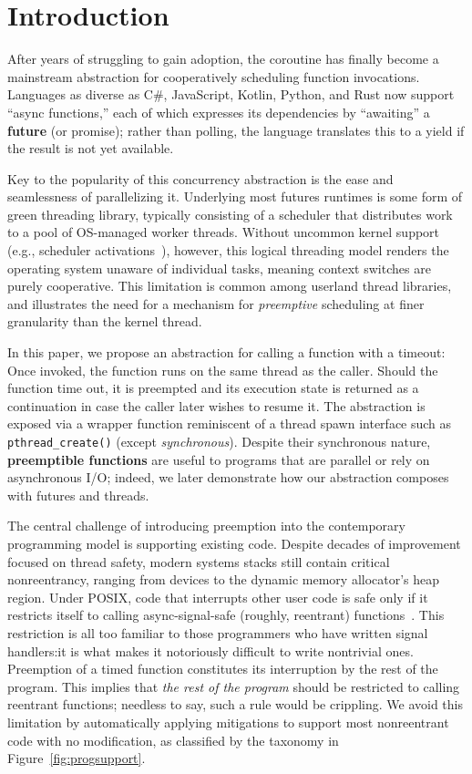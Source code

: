 \section{Introduction}
\label{sec:intro}

After years of struggling to gain adoption, the coroutine has finally become a
mainstream abstraction for cooperatively scheduling function invocations.  Languages
as diverse as C\#, JavaScript, Kotlin, Python, and Rust now support ``async
functions,'' each of which expresses its dependencies by ``awaiting'' a
\textbf{future} (or promise); rather than polling, the language translates this to a
yield if the result is not yet available.

Key to the popularity of this concurrency abstraction is the ease and seamlessness of
parallelizing it.  Underlying most futures runtimes is some form of green threading
library, typically consisting of a scheduler that distributes work to a pool of
OS-managed worker threads.  Without uncommon kernel
support (e.g., scheduler activations~\cite{anderson:sosp1991}), however, this logical
threading model renders the operating system unaware of individual tasks, meaning
context switches are purely cooperative.  This limitation is common among userland
thread libraries, and illustrates the need for a mechanism for \textit{preemptive}
scheduling at finer granularity than the kernel thread.

In this paper, we propose an abstraction for calling a function with a timeout:  Once
invoked, the function runs on the same thread as the caller.  Should the function
time out, it is preempted and its execution state is returned as a continuation in
case the caller later wishes to resume it.  The abstraction is exposed via a wrapper
function reminiscent of a thread spawn interface such as \texttt{pthread\_create()}
(except \textit{synchronous}).  Despite their synchronous nature, \textbf{preemptible
functions} are useful to programs that are parallel or rely on asynchronous I/O;
indeed, we later demonstrate how our abstraction composes with futures and threads.

The central challenge of introducing preemption into the contemporary programming
model is supporting existing code.  Despite decades of improvement focused on thread
safety, modern systems stacks still contain critical nonreentrancy, ranging from
devices to the dynamic memory allocator's heap region.
Under POSIX, code that interrupts other user code is safe only if it restricts
itself to calling async-signal-safe (roughly, reentrant)
functions~\cite{signal-safety-manpage}.  This restriction is all too familiar to
those programmers who have written signal handlers:\@ it is what makes it notoriously
difficult to write nontrivial ones.  Preemption of a timed function constitutes its
interruption by the rest of the program.  This implies that \textit{the rest of the
program} should be restricted to calling reentrant functions; needless to say, such
a rule would be crippling.  We avoid this limitation by automatically applying
mitigations to support most nonreentrant code with no modification, as classified by
the taxonomy in Figure~\ref{fig:progsupport}.

